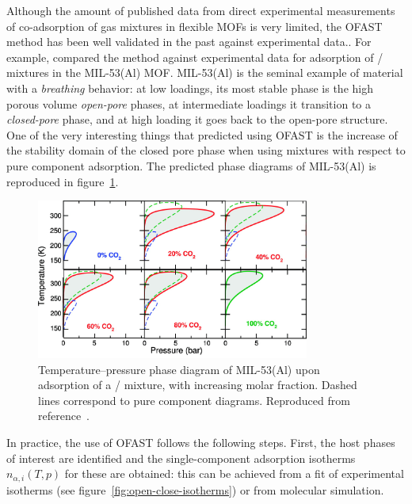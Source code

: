 \documentclass[thesis]{subfiles}
\begin{document}
Although the amount of published data from direct experimental measurements of
co-adsorption of gas mixtures in flexible MOFs is very limited, the OFAST method
has been well validated in the past against experimental data.\cite{Ortiz2011,
Hoffmann2011, Zang2011}. For example, \citeauthor{Ortiz2011}\cite{Ortiz2011}
compared the method against experimental data for adsorption of
/ mixtures in the MIL-53(Al) MOF. MIL-53(Al) is the seminal
example of material with a \emph{breathing} behavior: at low loadings, its most
stable phase is the high porous volume \emph{open-pore} phases, at intermediate
loadings it transition to a \emph{closed-pore} phase, and at high loading it
goes back to the open-pore structure. One of the very interesting things that
\citeauthor{Ortiz2011} predicted using OFAST is the increase of the stability
domain of the closed pore phase when using mixtures with respect to pure
component adsorption. The predicted phase diagrams of MIL-53(Al) is reproduced
in figure~\ref{fig:ofast:ortiz}.

\begin{figure}[ht]
    \centering
    \includegraphics[width=0.8\textwidth]{figures/cited/ofast-phase-diagram-rotated}
    \caption{Temperature–pressure phase diagram of MIL-53(Al) upon adsorption
    of a / mixture, with increasing  molar fraction.
    Dashed lines correspond to pure component diagrams.
    Reproduced from reference~.}
    \label{fig:ofast:ortiz}
\end{figure}

In practice, the use of OFAST follows the following steps. First, the host
phases of interest are identified and the single-component adsorption isotherms
$n_{\alpha,i}(T, p)$ for these are obtained: this can be achieved from a fit of
experimental isotherms (see figure~\ref{fig:open-close-isotherms}) or from
molecular simulation.
\end{document}
